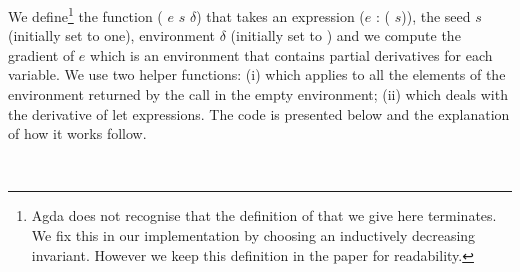 We define\footnote{Agda does not recognise that the definition of  that
we give here terminates.  We fix this in our implementation by choosing
an inductively decreasing invariant.  However we keep this definition in the
paper for readability.} the function ( $e$ $s$ $\delta$) that takes an
expression ($e$ :   ( $s$)), the seed $s$ (initially set
to one), environment $\delta$ (initially set to ) and we compute
the gradient of $e$ which is an environment that contains partial derivatives
for each variable.
We use two helper functions: (i)  which applies  to all
the elements of the environment returned by the  call in the empty environment;
(ii)  which deals with the derivative of let expressions.  The code is presented
below and the explanation of how it works follow.
\begin{code}[hide]%
%
\>[2]\AgdaSymbol{\{-\#}\AgdaSpace{}%
\AgdaSpace{}%
\AgdaSymbol{\#-\}}%
\>[23]\<%
\\
%
\>[23]\<%
\end{code}
